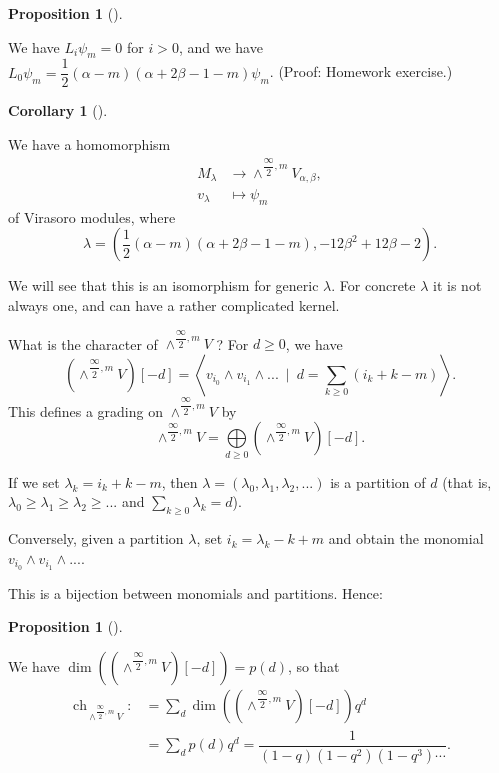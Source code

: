 \documentclass
[numbers=enddot,12pt,final,onecolumn,german,notitlepage]{scrartcl}%
\theoremstyle{definition}
\newtheorem{prop}[theo]{Proposition}
\newenvironment{proposition}[1][]
{\begin{prop}[#1]\begin{leftbar}}
{\end{leftbar}\end{prop}}
\newtheorem{coro}[theo]{Corollary}
\newenvironment{corollary}[1][]
{\begin{coro}[#1]\begin{leftbar}}
{\end{leftbar}\end{coro}}
\begin{document}
\begin{proposition}
We have $L_{i}\psi_{m}=0$ for $i>0$, and we have $L_{0}\psi_{m}=\dfrac{1}%
{2}\left(  \alpha-m\right)  \left(  \alpha+2\beta-1-m\right)  \psi_{m}$.
(Proof: Homework exercise.)
\end{proposition}

\begin{corollary}
We have a homomorphism%
\begin{align*}
M_{\lambda}  &  \rightarrow\wedge^{\dfrac{\infty}{2},m}V_{\alpha,\beta},\\
v_{\lambda}  &  \mapsto\psi_{m}%
\end{align*}
of Virasoro modules, where%
\[
\lambda=\left(  \dfrac{1}{2}\left(  \alpha-m\right)  \left(  \alpha
+2\beta-1-m\right)  ,-12\beta^{2}+12\beta-2\right)  .
\]

\end{corollary}

We will see that this is an isomorphism for generic $\lambda$. For concrete
$\lambda$ it is not always one, and can have a rather complicated kernel.

What is the character of $\wedge^{\dfrac{\infty}{2},m}V$ ? For $d\geq0$, we
have%
\[
\left(  \wedge^{\dfrac{\infty}{2},m}V\right)  \left[  -d\right]  =\left\langle
v_{i_{0}}\wedge v_{i_{1}}\wedge...\ \mid\ d=\sum\limits_{k\geq0}\left(
i_{k}+k-m\right)  \right\rangle .
\]
This defines a grading on $\wedge^{\dfrac{\infty}{2},m}V$ by%
\[
\wedge^{\dfrac{\infty}{2},m}V=\bigoplus\limits_{d\geq0}\left(  \wedge
^{\dfrac{\infty}{2},m}V\right)  \left[  -d\right]  .
\]


If we set $\lambda_{k}=i_{k}+k-m$, then $\lambda=\left(  \lambda_{0}%
,\lambda_{1},\lambda_{2},...\right)  $ is a partition of $d$ (that is,
$\lambda_{0}\geq\lambda_{1}\geq\lambda_{2}\geq...$ and $\sum\limits_{k\geq
0}\lambda_{k}=d$).

Conversely, given a partition $\lambda$, set $i_{k}=\lambda_{k}-k+m$ and
obtain the monomial $v_{i_{0}}\wedge v_{i_{1}}\wedge...$.

This is a bijection between monomials and partitions. Hence:

\begin{proposition}
We have $\dim\left(  \left(  \wedge^{\dfrac{\infty}{2},m}V\right)  \left[
-d\right]  \right)  =p\left(  d\right)  $, so that%
\begin{align*}
\operatorname*{ch}\nolimits_{\wedge^{\dfrac{\infty}{2},m}V}:  &  =\sum_{d}%
\dim\left(  \left(  \wedge^{\dfrac{\infty}{2},m}V\right)  \left[  -d\right]
\right)  q^{d}\\
&  =\sum_{d}p\left(  d\right)  q^{d}=\dfrac{1}{\left(  1-q\right)  \left(
1-q^{2}\right)  \left(  1-q^{3}\right)  \cdots}.
\end{align*}

\end{proposition}
\end{document}
